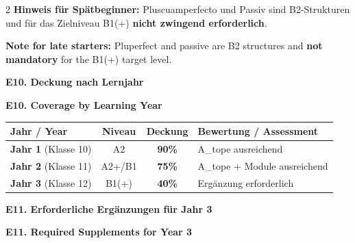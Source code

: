 \documentclass[10pt,a4paper]{article}
\newcommand{\secbil}[2]{%
\vspace{6pt}
\noindent\colorbox{spaet}{\parbox{0.48\textwidth}{\color{white}\bfseries\small #1}}%
\hfill%
\colorbox{english}{\parbox{0.48\textwidth}{\color{white}\bfseries\small #2}}
\vspace{3pt}
}
\begin{document}
\vspace{2mm}

\begin{paracol}{2}
\scriptsize
\textbf{Hinweis für Spätbeginner:} Pluscuamperfecto und Passiv sind B2-Strukturen und für das Zielniveau B1(+) \textbf{nicht zwingend erforderlich}.

\switchcolumn

\scriptsize\color{english}
\textbf{Note for late starters:} Pluperfect and passive are B2 structures and \textbf{not mandatory} for the B1(+) target level.

\end{paracol}

\vspace{3mm}

\secbil{E10. Deckung nach Lernjahr}{E10. Coverage by Learning Year}

\vspace{2mm}

\begin{center}
\small
\begin{tabular}{|l|c|c|p{6cm}|}
\hline
\rowcolor{lightgray}
\textbf{Jahr / Year} & \textbf{Niveau} & \textbf{Deckung} & \textbf{Bewertung / Assessment} \\
\hline
\textbf{Jahr 1} (Klasse 10) & A2 & \textcolor{spaet}{\textbf{90\%}} & A\_tope ausreichend \\
\hline
\textbf{Jahr 2} (Klasse 11) & A2+/B1 & \textcolor{spaet}{\textbf{75\%}} & A\_tope + Module ausreichend \\
\hline
\rowcolor{lightred}
\textbf{Jahr 3} (Klasse 12) & B1(+) & \textcolor{spanisch}{\textbf{40\%}} & Ergänzung erforderlich \\
\hline
\end{tabular}
\end{center}

\vspace{3mm}

\secbil{E11. Erforderliche Ergänzungen für Jahr 3}{E11. Required Supplements for Year 3}

\vspace{2mm}
\end{document}
